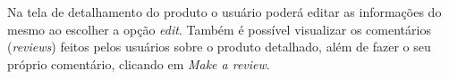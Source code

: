 Na tela de detalhamento do produto o usuário poderá editar as informações do mesmo ao escolher a opção \textit{edit}. Também é possível visualizar os comentários (\textit{reviews}) feitos pelos usuários sobre o produto detalhado, além de fazer o seu próprio comentário, clicando em \textit{Make a review}.


